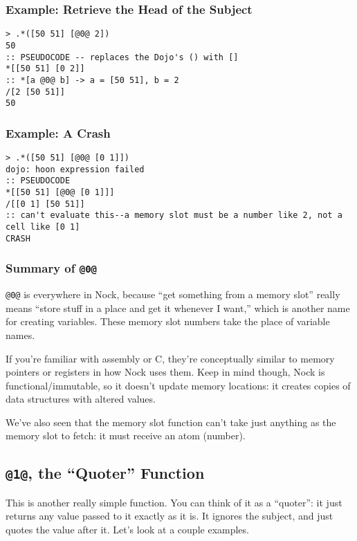 \documentclass[twoside]{article}
\begin{document}
\subsubsection{Example:  Retrieve the Head of the Subject}

\begin{lstlisting}[style=listingcode]
> .*([50 51] [@0@ 2])
50
:: PSEUDOCODE -- replaces the Dojo's () with []
*[[50 51] [0 2]]
:: *[a @0@ b] -> a = [50 51], b = 2
/[2 [50 51]]
50
\end{lstlisting}

\subsubsection{Example:  A Crash}

\begin{lstlisting}[style=listingcode]
> .*([50 51] [@0@ [0 1]])
dojo: hoon expression failed
:: PSEUDOCODE
*[[50 51] [@0@ [0 1]]]
/[[0 1] [50 51]]
:: can't evaluate this--a memory slot must be a number like 2, not a cell like [0 1]
CRASH
\end{lstlisting}

\subsubsection{Summary of \lstinline[style=inlinecode]{@0@}}

\lstinline[style=inlinecode]{@0@} is everywhere in Nock, because “get something from a memory slot” really means “store stuff in a place and get it whenever I want,” which is another name for creating variables. These memory slot numbers take the place of variable names.

If you're familiar with assembly or C, they're conceptually similar to memory pointers or registers in how Nock uses them. Keep in mind though, Nock is functional/immutable, so it doesn't update memory locations: it creates copies of data structures with altered values.

We've also seen that the memory slot function can't take just anything as the memory slot to fetch: it must receive an atom (number).

\subsection{\lstinline[style=inlinecode]{@1@}, the “Quoter” Function}
\label{sxn:nock1}

This is another really simple function. You can think of it as a “quoter”: it just returns any value passed to it exactly as it is. It ignores the subject, and just quotes the value after it. Let's look at a couple examples.
\end{document}
